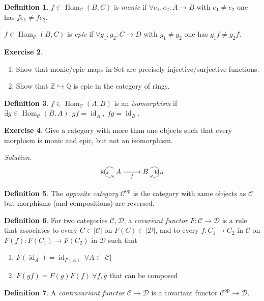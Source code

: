 \documentclass{article}
\newcommand{\Z}{\mathbb{Z}}
\newcommand{\Q}{\mathbb{Q}}
\newcommand{\id}{\operatorname{id}}
\newcommand{\Hom}{\operatorname{Hom}}
\newcommand{\op}{{\operatorname{op}}}
\newcommand{\ca}{\mathcal{C}}
\newcommand{\da}{\mathcal{D}}
\theoremstyle{definition}
\newtheorem{defn}{Definition}[subsection]
\newtheorem{exe}[defn]{Exercise}
\begin{document}
\begin{defn}
$f\in\Hom_\ca(B,C)$ is \textit{monic} if $\forall e_1,e_2:A\rightarrow B$ with $e_1\neq e_2$ one has $fe_1\neq fe_2$.

$f\in\Hom_\ca(B,C)$ is \textit{epic} if $\forall g_1,g_2:C\rightarrow D$ with $g_1\neq g_2$ one has $g_1f\neq g_2f$.
\end{defn}

\begin{exe}
\begin{enumerate}
\item Show that monic/epic maps in Set are precisely injective/surjective functions.
\item Show that $\Z\hookrightarrow\Q$ is epic in the category of rings.
\end{enumerate}
\end{exe}

\begin{defn}
$f\in\Hom_\ca(A,B)$ is an \textit{isomorphism} if $\exists g\in\Hom_\ca(B,A):gf=\id_A,\ fg=\id_B$.
\end{defn}

\begin{exe}
Give a category with more than one objects such that every morphism is monic and epic, but not an isomorphism.

\textit{Solution}.
\[
\xymatrix{
A\ar[r]_f \ar@(lu,ld)[]|{\id_A} & B \ar@(ru,rd)[]|{\id_B}
}
\]
\end{exe}

\begin{defn}
The \textit{opposite category} $\ca^\op$ is the category with same objects as $\ca$ but morphisms (and compositions) are reversed.
\end{defn}

\begin{defn}
For two categories $\ca,\da$, a \textit{covariant functor} $F:\ca\rightarrow\da$ is a rule that associates to every $C\in|\ca|$ on $F(C)\in|\da|$, and to every $f:C_1\rightarrow C_2$ in $\ca$ on $F(f):F(C_1)\rightarrow F(C_2)$ in $\da$ such that
\begin{enumerate}
\item $F(\id_A)=\id_{F(A)} \ \forall A\in|\ca|$
\item $F(gf)=F(g)F(f) \ \forall f,g$ that can be composed
\end{enumerate}
\end{defn}

\begin{defn}
A \textit{contravariant functor} $\ca\rightarrow\da$ is a covariant functor $\ca^\op\rightarrow\da$.
\end{defn}
\end{document}
